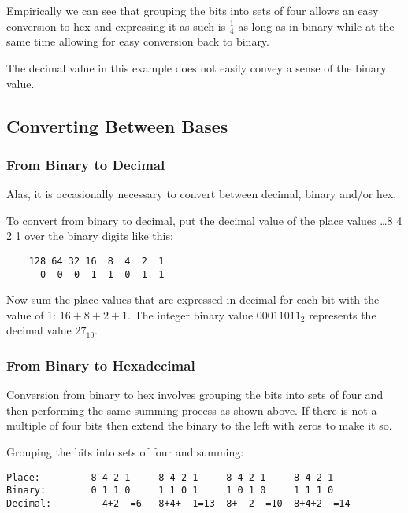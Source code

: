 Empirically we can see that grouping the bits into sets of four
allows an easy conversion to hex and expressing it as such is
$\frac{1}{4}$ as long as in binary while at the same time
allowing for easy conversion back to binary.

The decimal value in this example does not easily convey a sense
of the binary value.

\subsection{Converting Between Bases}

\subsubsection{From Binary to Decimal}
\label{section:bindec}

Alas, it is occasionally necessary to convert between decimal,
binary and/or hex.

To convert from binary to decimal, put the decimal value of the place values 
{\ldots8 4 2 1} over the binary digits like this:

\begin{verbatim}
    128 64 32 16  8  4  2  1
      0  0  0  1  1  0  1  1
\end{verbatim}

Now sum the place-values that are expressed in decimal for each 
bit with the value of 1: $16+8+2+1$.  The integer binary value
$00011011_2$ represents the decimal value $27_{10}$.

\subsubsection{From Binary to Hexadecimal}
\label{section:binhex}

Conversion from binary to hex involves grouping the bits into
sets of four and then performing the same summing process as 
shown above.  If there is not a multiple of four bits then
extend the binary to the left with zeros to make it so.

Grouping the bits into sets of four and summing:

\begin{verbatim}
Place:         8 4 2 1     8 4 2 1     8 4 2 1     8 4 2 1
Binary:        0 1 1 0     1 1 0 1     1 0 1 0     1 1 1 0
Decimal:         4+2  =6   8+4+  1=13  8+  2  =10  8+4+2  =14
\end{verbatim}

